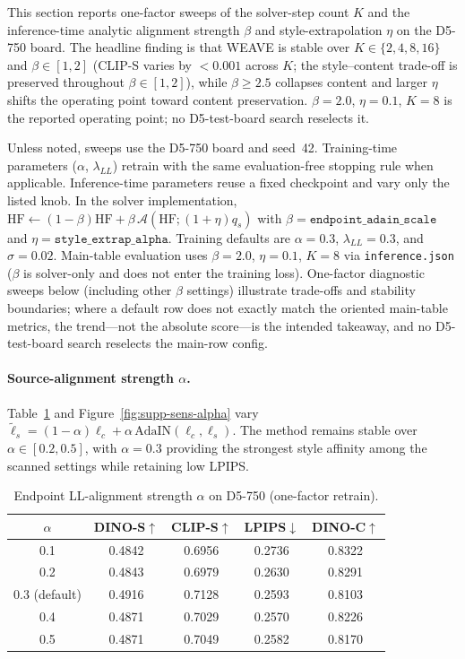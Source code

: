 \documentclass[letterpaper]{article}
\begin{document}
This section reports one-factor sweeps of the solver-step count $K$ and the inference-time
analytic alignment strength $\beta$ and style-extrapolation $\eta$ on the D5-750 board. The
headline finding is that WEAVE is stable over $K\in\{2,4,8,16\}$ and
$\beta\in[1,2]$ (CLIP-S varies by $<0.001$ across $K$; the style--content trade-off is
preserved throughout $\beta\in[1,2]$), while $\beta\ge2.5$ collapses content and larger
$\eta$ shifts the operating point toward content preservation. $\beta{=}2.0$, $\eta{=}0.1$,
$K{=}8$ is the reported operating point; no D5-test-board search reselects it.

Unless noted, sweeps use the D5-750 board and seed~42. Training-time parameters
($\alpha$, $\lambda_{LL}$) retrain with the same evaluation-free stopping rule when
applicable. Inference-time parameters reuse a fixed checkpoint and vary only the listed knob.
In the solver implementation,
$\mathrm{HF}\leftarrow(1-\beta)\mathrm{HF}+\beta\,\mathcal A(\mathrm{HF};(1+\eta)q_s)$ with
$\beta=\texttt{endpoint\_adain\_scale}$ and $\eta=\texttt{style\_extrap\_alpha}$. Training
defaults are $\alpha{=}0.3$, $\lambda_{LL}{=}0.3$, and $\sigma{=}0.02$. Main-table
evaluation uses $\beta{=}2.0$, $\eta{=}0.1$, $K{=}8$ via \texttt{inference.json}
($\beta$ is solver-only and does not enter the training loss). One-factor diagnostic
sweeps below (including other $\beta$ settings) illustrate
trade-offs and stability boundaries; where a default row does not exactly match the oriented
main-table metrics, the trend---not the absolute score---is the intended takeaway, and no
D5-test-board search reselects the main-row config.

\paragraph{Source-alignment strength $\alpha$.}
Table~\ref{tab:supp-alpha} and Figure~\ref{fig:supp-sens-alpha} vary
$\tilde\ell_s=(1-\alpha)\ell_c+\alpha\,\mathrm{AdaIN}(\ell_c,\ell_s)$.
The method remains stable over $\alpha\in[0.2,0.5]$, with $\alpha{=}0.3$ providing the
strongest style affinity among the scanned settings while retaining low LPIPS.

\begin{table}[t]
\centering
\small
\setlength{\tabcolsep}{4pt}
\begin{tabular}{@{}ccccc@{}}
\toprule
$\alpha$ & DINO-S$\uparrow$ & CLIP-S$\uparrow$ & LPIPS$\downarrow$ & DINO-C$\uparrow$ \\
\midrule
0.1 & 0.4842 & 0.6956 & 0.2736 & 0.8322 \\
0.2 & 0.4843 & 0.6979 & 0.2630 & 0.8291 \\
0.3 (default) & 0.4916 & 0.7128 & 0.2593 & 0.8103 \\
0.4 & 0.4871 & 0.7029 & 0.2570 & 0.8226 \\
0.5 & 0.4871 & 0.7049 & 0.2582 & 0.8170 \\
\bottomrule
\end{tabular}
\caption{Endpoint LL-alignment strength $\alpha$ on D5-750 (one-factor retrain).}
\label{tab:supp-alpha}
\end{table}
\end{document}
